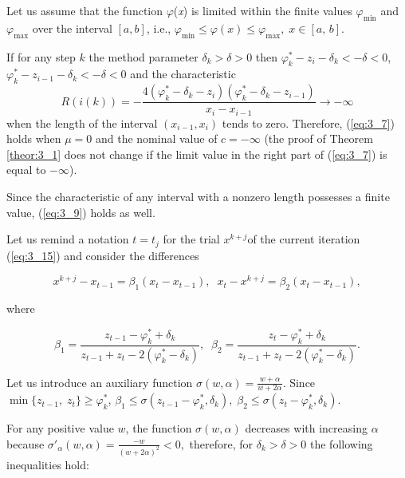 	Let us assume that the function \textit{$\varphi$}(\textit{x}) is limited within the finite values $\varphi _{\min } $ and $\varphi _{\max } $ over the interval $[a,b]$, i.e., $\varphi _{\min } \le \varphi (x)\le \varphi _{\max } ,\; x\in [a,\, b]$.
	
	If for any step $k$ the method parameter $\delta _{k} >\delta >0$ then $\varphi _{k}^{*} -z_{i} -\delta _{k} <-\delta <0$, $\varphi _{k}^{*} -z_{i-1} -\delta _{k} <-\delta <0$ and the characteristic 
	\[R(i(k))=-\frac{4(\varphi _{k}^{*} -\delta _{k} -z_{i} )(\varphi _{k}^{*} -\delta _{k} -z_{i-1} )}{x_{i} -x_{i-1} } \to -\infty \] 
	when the length of the interval $(x_{i-1} ,x_{i} )$ tends to zero. Therefore,  (\ref{eq:3_7}) holds when $\mu = 0$ and the nominal value of $c=-\infty $ (the proof of Theorem \ref{theor:3_1} does not change if the limit value in the right part of  (\ref{eq:3_7}) is equal to $-\infty$). 
	
	Since the characteristic of any interval with a nonzero length possesses a finite value,  (\ref{eq:3_9}) holds as well.
	
	Let us remind a notation $t=t_{j} $ for the trial $x^{k+j} $of the current iteration  (\ref{eq:3_15}) and consider the differences 
	
	\begin{equation*}
	x^{k+j} -x_{t-1} =\beta _{1} (x_{t} -x_{t-1} ),\; \; x_{t} -x^{k+j} =\beta _{2} (x_{t} -x_{t-1} ), 
	\end{equation*}
	
	where

	\begin{equation*}
	\beta _{1} =\frac{z_{t-1} -\varphi _{k}^{*} +\delta _{k} }{z_{t-1} +z_{t} -2(\varphi _{k}^{*} -\delta _{k} )} ,\; \; \beta _{2} =\frac{z_{t} -\varphi _{k}^{*} +\delta _{k} }{z_{t-1} +z_{t} -2(\varphi _{k}^{*} -\delta _{k} )}.
	\end{equation*}
	
	Let us introduce an auxiliary function $\sigma (w,\alpha )=\frac{w+\alpha }{w+2\alpha } $. Since $\min \{ z_{t-1} ,\; z_{t} \} \ge \varphi _{k}^{*} $, $\beta _{1} \le \sigma (z_{t-1} -\varphi _{k}^{*} ,\delta _{k} ),\; \beta _{2} \le \sigma (z_{t} -\varphi _{k}^{*} ,\delta _{k} )$. 
	
	For any positive value $w$, the function $\sigma (w,\alpha )$ decreases with increasing $\alpha$ because $\sigma '_{\alpha } (w,\alpha )=\frac{-w}{(w+2\alpha )^{2} } <0,$ therefore, for $\delta _{k} >\delta >0$ the following inequalities hold:
	
